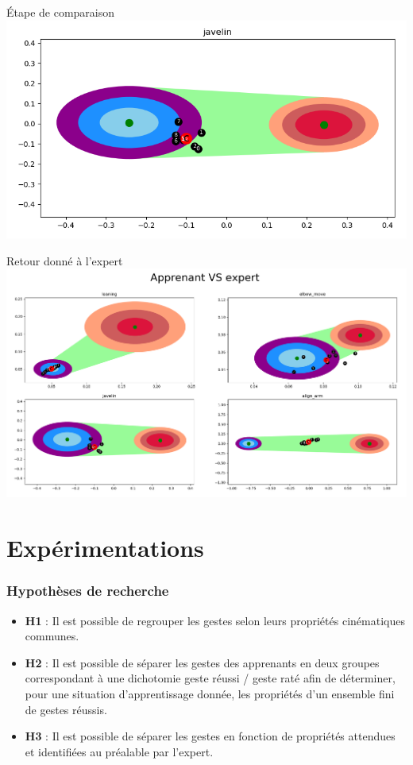 \documentclass[svgnames]{beamer}
\begin{document}
	\begin{frame}{Étape de comparaison}
	\centering
		\includegraphics[scale=0.4]{img/feedback_one.png}
	\end{frame}
	
	\begin{frame}{Retour donné à l'expert}
	\centering
		\includegraphics[scale=0.25]{img/feedback_grp_example.png}
	\end{frame}

	\part{Expérimentations}
	\section{Hypothèses de recherche}
	\begin{frame}{\secname}
		\begin{itemize}[label=$-$]
			\item \textbf{H1} : Il est possible de regrouper les gestes selon leurs propriétés cinématiques communes.
			\item \textbf{H2} : Il est possible de séparer les gestes des apprenants en deux groupes correspondant à une dichotomie geste réussi / geste raté afin de déterminer, pour une situation d'apprentissage donnée, les propriétés d'un ensemble fini de gestes réussis.
			\item \textbf{H3} : Il est possible de séparer les gestes en fonction de propriétés attendues et identifiées au préalable par l'expert.
		\end{itemize}
	\end{frame}
	
\end{document}
